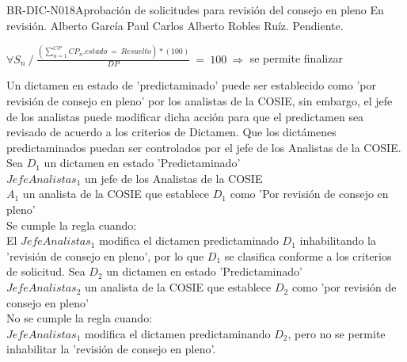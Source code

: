 \begin{BusinessRule}{BR-DIC-N018}{Aprobación de solicitudes para revisión del consejo en pleno}
	{\bcCondition} %
	{\btExecutive}     %
	{\blControlling}     %
	\BRItem[Estado] En revisión.
	 Alberto García Paul	
	 Carlos Alberto Robles Ruíz.
	 Pendiente.	\begin{center}
		$  \forall S_{n} \: / \:\frac{(\sum_{n=1}^{CP}CP_{n}.estado \: = \: Resuelto)*(100)}{DP} \: = \: 100 \: \Rightarrow$ se permite finalizar 
	\end{center}
	\BRItem[Descripción] Un dictamen en estado de 'predictaminado' puede ser establecido como 'por revisión de consejo en pleno' por los analistas de la COSIE, sin embargo, el jefe de los analistas puede modificar dicha acción para que el predictamen sea revisado de acuerdo a los criterios de Dictamen.
	\BRItem[Motivación] Que los dictámenes predictaminados puedan ser controlados por el jefe de los Analistas de la COSIE. 
	Sea $D_{1}$ un dictamen en estado 'Predictaminado'\\
	$JefeAnalistas_{1}$ un jefe de los Analistas de la COSIE\\
	$A_{1}$ un analista de la COSIE que establece $D_{1}$ como 'Por revisión de consejo en pleno'\\
	Se cumple la regla cuando:\\
	El $JefeAnalistas_{1}$ modifica el dictamen predictaminado $D_{1}$ inhabilitando la 'revisión de consejo en pleno', por lo que $D_{1}$ se clasifica conforme a los criterios de solicitud. 
	Sea $D_{2}$ un dictamen en estado 'Predictaminado'\\
	$JefeAnalistas_{2}$ un analista de la COSIE que establece $D_{2}$ como 'por revisión de consejo en pleno'\\
	No se cumple la regla cuando:\\
	$JefeAnalistas_{1}$ modifica el dictamen predictaminando $D_{2}$, pero no se permite inhabilitar la 'revisión de consejo en pleno'. 
\end{BusinessRule}




